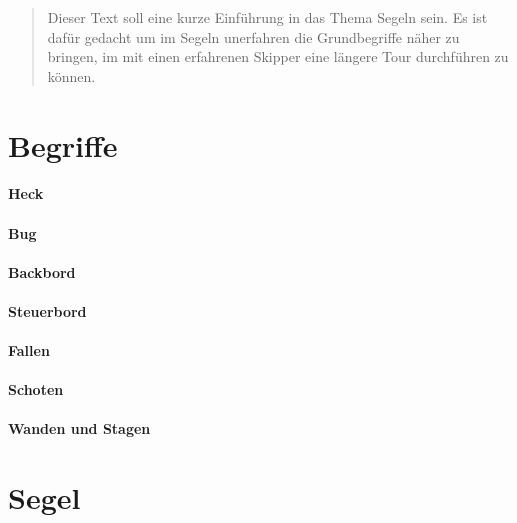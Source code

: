 \documentclass[12pt]{article}
\begin{document}
\maketitle

\begin{abstract}
Dieser Text soll eine kurze Einführung in das Thema Segeln sein. Es ist dafür gedacht um im Segeln unerfahren die Grundbegriffe näher zu bringen, im mit einen erfahrenen Skipper eine längere Tour durchführen zu können.
\end{abstract}

\section{Begriffe}

\paragraph{Heck}
\paragraph{Bug}
\paragraph{Backbord}
\paragraph{Steuerbord}
\paragraph{Fallen}

\paragraph{Schoten}

\paragraph{Wanden und Stagen}

\section{Segel}
\end{document}
